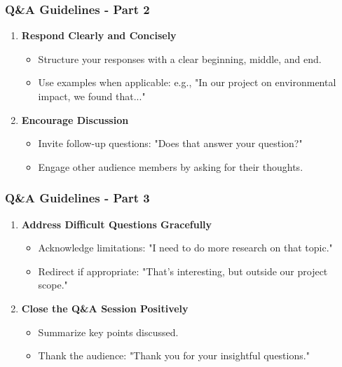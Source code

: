 \documentclass{beamer}
\begin{document}
\begin{frame}[fragile]
    \frametitle{Q\&A Guidelines - Part 2}
    \begin{enumerate}[resume]
        \item \textbf{Respond Clearly and Concisely}
            \begin{itemize}
                \item Structure your responses with a clear beginning, middle, and end.
                \item Use examples when applicable: e.g., "In our project on environmental impact, we found that..."
            \end{itemize}
        \item \textbf{Encourage Discussion}
            \begin{itemize}
                \item Invite follow-up questions: "Does that answer your question?"
                \item Engage other audience members by asking for their thoughts.
            \end{itemize}
    \end{enumerate}
\end{frame}

\begin{frame}[fragile]
    \frametitle{Q\&A Guidelines - Part 3}
    \begin{enumerate}[resume]
        \item \textbf{Address Difficult Questions Gracefully}
            \begin{itemize}
                \item Acknowledge limitations: "I need to do more research on that topic."
                \item Redirect if appropriate: "That’s interesting, but outside our project scope."
            \end{itemize}
        \item \textbf{Close the Q\&A Session Positively}
            \begin{itemize}
                \item Summarize key points discussed.
                \item Thank the audience: "Thank you for your insightful questions."
            \end{itemize}
    \end{enumerate}
\end{frame}
\end{document}
